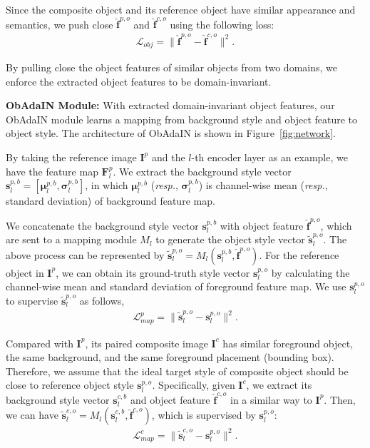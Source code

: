 \documentclass[letterpaper]{article} %
\begin{document}
Since the composite object and its reference object have similar appearance and semantics, we push close $\hat{\bm{f}}^{p,o}$ and $\hat{\bm{f}}^{c,o}$ using the following loss:
\begin{eqnarray}\label{eqn:loss_obj}
\mathcal{L}_{obj} = \|\hat{\bm{f}}^{p,o}-\hat{\bm{f}}^{c,o}\|^2.
\end{eqnarray}

By pulling close the object features of similar objects from two domains,  we enforce the extracted object features to be domain-invariant.

\textbf{ObAdaIN Module: }With extracted domain-invariant object features, our ObAdaIN module learns a mapping from background style and object feature to object style. The architecture of ObAdaIN is shown in Figure~\ref{fig:network}.

By taking the reference image $\bm{I}^p$ and the $l$-th encoder layer as an example, we have the feature map $\bm{F}^p_l$. We extract the background style vector $\bm{s}^{p,b}_l=[\bm{\mu}^{p,b}_l, \bm{\sigma}^{p,b}_l]$, in which $\bm{\mu}^{p,b}_l$ (\emph{resp.}, $\bm{\sigma}^{p,b}_l$) is channel-wise mean (\emph{resp.}, standard deviation) of background feature map.

We concatenate the background style vector $\bm{s}^{p,b}_l$ with object feature $\hat{\bm{f}}^{p,o}$, which are sent to a mapping module $M_l$ to generate the object style vector $\tilde{\bm{s}}^{p,o}_l$.
The above process can be represented by $\tilde{\bm{s}}^{p,o}_l=M_l(\bm{s}^{p,b}_l, \hat{\bm{f}}^{p,o})$.
For the reference object in  $\bm{I}^p$, we can obtain its ground-truth style vector $\bm{s}^{p,o}_l$ by calculating the channel-wise mean and standard deviation of foreground feature map. We use $\bm{s}^{p,o}_l$ to supervise $\tilde{\bm{s}}^{p,o}_l$ as follows,
\begin{eqnarray}
\mathcal{L}_{map}^p = \|\tilde{\bm{s}}^{p,o}_l-\bm{s}^{p,o}_l\|^2.
\end{eqnarray}

Compared with $\bm{I}^p$, its paired composite image $\bm{I}^c$ has similar foreground object, the same background, and the same foreground placement (bounding box). Therefore, we assume that the ideal target style of composite object should be close to reference object style $\bm{s}^{p,o}_l$.
Specifically, given $\bm{I}^c$, we extract its background style vector $\bm{s}^{c,b}_l$ and object feature $\hat{\bm{f}}^{c,o}$ in a similar way to $\bm{I}^p$. Then, we can have $\tilde{\bm{s}}^{c,o}_l=M_l(\bm{s}^{c,b}_l, \hat{\bm{f}}^{c,o})$, which is supervised by $\bm{s}^{p,o}_l$:
\begin{eqnarray}
\mathcal{L}_{map}^c = \|\tilde{\bm{s}}^{c,o}_l-\bm{s}^{p,o}_l\|^2.
\end{eqnarray}
\end{document}
